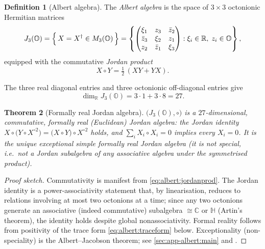 \documentclass[11pt]{article}
\theoremstyle{plain}
\newtheorem{theorem}{Theorem}[section]
\theoremstyle{definition}
\newtheorem{definition}[theorem]{Definition}
\theoremstyle{remark}
\begin{document}
\begin{definition}[Albert algebra]\label{def:albert:J3O}
The \emph{Albert algebra} is the space of $3\times 3$ octonionic
Hermitian matrices
\begin{equation}\label{eq:albert:J3Odef}
  J_{3}(\mathbb{O})
  =\Bigl\{\,X=X^{\dagger}\in M_{3}(\mathbb{O})\,\Bigr\}
  =\left\{
  \begin{pmatrix}
   \xi_{1} & z_{3} & \bar z_{2}\\
   \bar z_{3} & \xi_{2} & z_{1}\\
   z_{2} & \bar z_{1} & \xi_{3}
  \end{pmatrix}
  : \xi_{i}\in\mathbb{R},\; z_{i}\in\mathbb{O}\right\},
\end{equation}
equipped with the commutative \emph{Jordan product}
\begin{equation}\label{eq:albert:jordanprod}
  X\circ Y=\tfrac12\,(XY+YX).
\end{equation}
\end{definition}

The three real diagonal entries and three octonionic off-diagonal
entries give
\begin{equation}\label{eq:albert:dim}
  \dim_{\mathbb{R}} J_{3}(\mathbb{O})
  = 3\cdot 1 + 3\cdot 8 = 27 .
\end{equation}

\begin{theorem}[Formally real Jordan algebra]\label{thm:albert:formallyreal}
$\bigl(J_{3}(\mathbb{O}),\circ\bigr)$ is a $27$-dimensional, commutative,
formally real (Euclidean) Jordan algebra: the Jordan identity
$X\circ\bigl(Y\circ X^{\circ 2}\bigr)=\bigl(X\circ Y\bigr)\circ X^{\circ 2}$
holds, and $\sum_{i} X_{i}\circ X_{i}=0$ implies every $X_{i}=0$. It is
the unique exceptional simple formally real Jordan algebra (it is not
special, i.e.\ not a Jordan subalgebra of any associative algebra under
the symmetrised product).
\end{theorem}

\begin{proof}[Proof sketch]
Commutativity is manifest from \eqref{eq:albert:jordanprod}. The Jordan
identity is a power-associativity statement that, by linearisation,
reduces to relations involving at most two octonions at a time; since any
two octonions generate an associative (indeed commutative) subalgebra
$\cong\mathbb{C}$ or $\mathbb{H}$ (Artin's theorem), the identity holds
despite global nonassociativity. Formal reality follows from positivity
of the trace form \eqref{eq:albert:traceform} below. Exceptionality
(non-speciality) is the Albert--Jacobson theorem; see
\autoref{sec:app-albert:main} and \cite{Albert:1934,Jacobson:1968,McCrimmon:2004}.
\end{proof}
\end{document}
